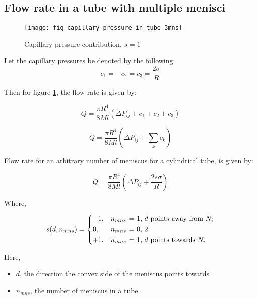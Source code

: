 \subsection{Flow rate in a tube with multiple menisci} \label{sec:multi-menisci-flow-rate}
	\begin{figure}[H]
		\centering
		\texttt{[image: fig\_capillary\_pressure\_in\_tube\_3mns]}
		\caption{Capillary pressure contribution, $s = 1$}
		\label{fig:capillary_pressure_in_tube_3mns}
	\end{figure}
	
	Let the capillary pressures be denoted by the following:
	\begin{equation}
		c_1 = -c_2 = c_3 = \frac{2 \sigma}{R}
	\end{equation}
	
	Then for figure \ref{fig:capillary_pressure_in_tube_3mns}, the flow rate is given by:
	
	\begin{equation}
		Q = \frac{\pi R^4}{8Ml} \left( \Delta P_{ij} + c_1 + c_2 + c_3 \right)
	\end{equation}
	
	\begin{equation}
		Q = \frac{\pi R^4}{8Ml} \left( \Delta P_{ij} + \sum_{k} c_{k} \right)
	\end{equation}
	
	Flow rate for an arbitrary number of meniscus for a cylindrical tube, is given by:
	
	\begin{equation} \label{eq:main-flow-rate-with-s}
		\boxed{Q = \frac{\pi R^4}{8Ml} \left( \Delta P_{ij} + \frac{2s \sigma}{R} \right)}
	\end{equation}
	
	Where,
	
	\begin{equation} \label{eq:sign-func-def}
		s(d, n_{mns}) = 
		\begin{dcases}
			-1,&\text{$n_{mns}$ = 1, $d$ points away from $N_{i}$}\\
			0,&\text{$n_{mns}$ = 0, 2}\\
			+1,&\text{$n_{mns}$ = 1, $d$ points towards $N_{i}$}
		\end{dcases}
	\end{equation}
	
	Here,
	\begin{itemize}
		\item $d$, the direction the convex side of the meniscus points towards
		\item $n_{mns}$, the number of meniscus in a tube
	\end{itemize}
	
